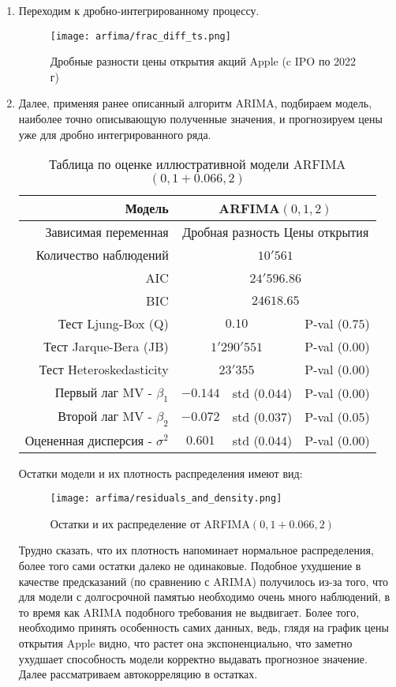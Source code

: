 \begin{enumerate}
	\item Переходим к дробно-интегрированному процессу.
	\begin{figure}[H]
		\centering
		\texttt{[image: arfima/frac\_diff\_ts.png]}
		\caption{Дробные разности цены открытия акций Apple (c IPO по 2022 г)}
	\end{figure}

	\item Далее, применяя ранее описанный алгоритм ARIMA, подбираем модель, наиболее точно описывающую полученные значения, и прогнозируем цены уже для дробно интегрированного ряда.
	\begin{table}[H]
		\centering
		\begin{tabular}{r|ccc}
			\toprule
			Модель & \multicolumn{3}{c}{ARFIMA$(0, 1, 2)$}\\
			\midrule[0.02cm]
			Зависимая переменная & \multicolumn{3}{c}{Дробная разность Цены открытия}\\
			Количество наблюдений & \multicolumn{3}{c}{$10'561$} \\
			AIC & \multicolumn{3}{c}{$24'596.86$} \\
			BIC & \multicolumn{3}{c}{$24618.65$} \\
			\midrule[0.02cm]
			Тест Ljung-Box (Q) & \multicolumn{2}{c}{$0.10$} & P-val ($0.75$)\\
			Тест Jarque-Bera (JB) & \multicolumn{2}{c}{$1'290'551$} & P-val ($0.00$)\\
			Тест Heteroskedasticity & \multicolumn{2}{c}{$23'355$} & P-val ($0.00$)\\
			\midrule[0.02cm]
			Первый лаг MV - $\beta_1$ & $-0.144$ & std ($0.044$) & P-val ($0.00$)\\
			Второй лаг MV - $\beta_2$ & $-0.072$ & std ($0.037$) & P-val ($0.05$)\\
			Оцененная дисперсия - $\sigma^2$ & $0.601$ & std ($0.044$) & P-val ($0.00$)\\
			\midrule[0.02cm]
		\end{tabular}
		\caption{Таблица по оценке иллюстративной модели ARFIMA$(0,1 + 0.066,2)$}
	\end{table}
	\noindent Остатки модели и их плотность распределения имеют вид:
	\begin{figure}[H]
		\centering
		\texttt{[image: arfima/residuals\_and\_density.png]}
		\caption{Остатки и их распределение от ARFIMA$(0, 1 + 0.066, 2)$}
	\end{figure}
	\noindent Трудно сказать, что их плотность напоминает нормальное распределения, более того сами остатки далеко не одинаковые. Подобное ухудшение в качестве предсказаний (по сравнению с ARIMA) получилось из-за того, что для модели с долгосрочной памятью необходимо очень много наблюдений, в то время как ARIMA подобного требования не выдвигает. Более того, необходимо принять особенность самих данных, ведь, глядя на график цены открытия Apple видно, что растет она экспоненциально, что заметно ухудшает способность модели корректно выдавать прогнозное значение. Далее рассматриваем автокорреляцию в остатках.

\end{enumerate}

